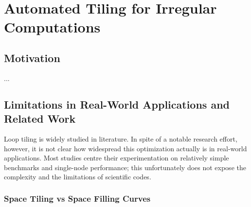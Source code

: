 \chapter{Automated Tiling for Irregular Computations}
\label{ch:sparsetiling}

\section{Motivation}
...


\section{Limitations in Real-World Applications and Related Work}
\label{sec:tiling:limits}
Loop tiling is widely studied in literature. In spite of a notable research effort, however, it is not clear how widespread this optimization actually is in real-world applications. Most studies centre their experimentation on relatively simple benchmarks and single-node performance; this unfortunately does not expose the complexity and the limitations of scientific codes. 

%
%
%
%
%
%
%

\subsection{Space Tiling vs Space Filling Curves}

